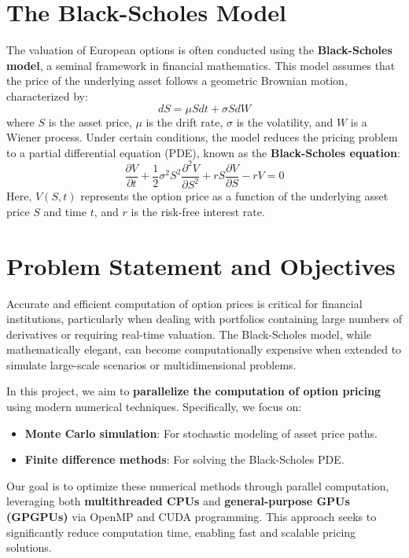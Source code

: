 \documentclass[12pt,a4paper]{report}
\begin{document}
\section{The Black-Scholes Model}
The valuation of European options is often conducted using the \textbf{Black-Scholes model}, a seminal framework in financial mathematics. This model assumes that the price of the underlying asset follows a geometric Brownian motion, characterized by:
\[
dS = \mu S dt + \sigma S dW
\]
where \(S\) is the asset price, \(\mu\) is the drift rate, \(\sigma\) is the volatility, and \(W\) is a Wiener process. Under certain conditions, the model reduces the pricing problem to a partial differential equation (PDE), known as the \textbf{Black-Scholes equation}:
\[
\frac{\partial V}{\partial t} + \frac{1}{2} \sigma^2 S^2 \frac{\partial^2 V}{\partial S^2} + rS \frac{\partial V}{\partial S} - rV = 0
\]
Here, \(V(S,t)\) represents the option price as a function of the underlying asset price \(S\) and time \(t\), and \(r\) is the risk-free interest rate.

\section{Problem Statement and Objectives}
Accurate and efficient computation of option prices is critical for financial institutions, particularly when dealing with portfolios containing large numbers of derivatives or requiring real-time valuation. The Black-Scholes model, while mathematically elegant, can become computationally expensive when extended to simulate large-scale scenarios or multidimensional problems.

In this project, we aim to \textbf{parallelize the computation of option pricing} using modern numerical techniques. Specifically, we focus on:
\begin{itemize}
    \item \textbf{Monte Carlo simulation}: For stochastic modeling of asset price paths.
    \item \textbf{Finite difference methods}: For solving the Black-Scholes PDE.
\end{itemize}

Our goal is to optimize these numerical methods through parallel computation, leveraging both \textbf{multithreaded CPUs} and \textbf{general-purpose GPUs (GPGPUs)} via OpenMP and CUDA programming. This approach seeks to significantly reduce computation time, enabling fast and scalable pricing solutions.
\end{document}
